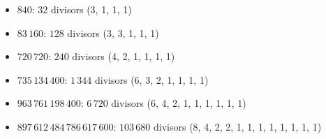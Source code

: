 \begin{itemize}
	\item $840$: $32$ divisors (3, 1, 1, 1)
	\item $83\,160$: $128$ divisors (3, 3, 1, 1, 1)
	\item $720\,720$: $240$ divisors (4, 2, 1, 1, 1, 1)
	\item $735\,134\,400$: $1\,344$ divisors (6, 3, 2, 1, 1, 1, 1)
	\item $963\,761\,198\,400$: $6\,720$ divisors (6, 4, 2, 1, 1, 1, 1, 1, 1)
	\item $897\,612\,484\,786\,617\,600$: $103\,680$ divisors (8, 4, 2, 2, 1, 1, 1, 1, 1, 1, 1, 1)
\end{itemize}